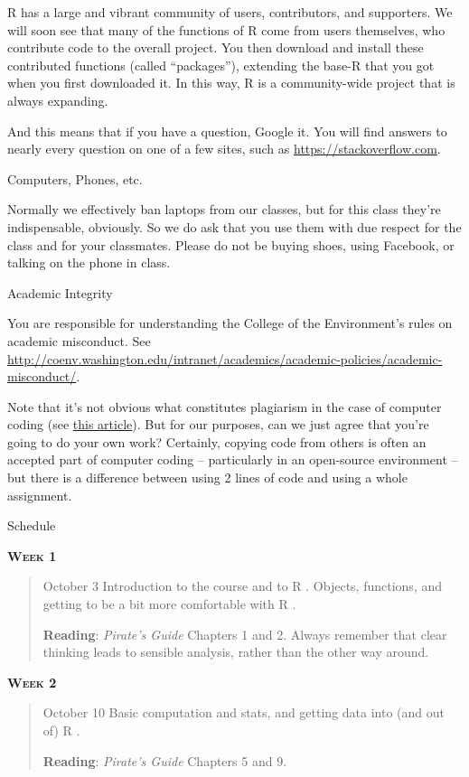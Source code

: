 \documentclass[11pt,letterpaper]{article}
\newcommand{\R}[0]{\textsf{R }}
\begin{document}
\R has a large and vibrant community of users, contributors, and supporters. We will soon see that many of the functions of \R come from users themselves, who contribute code to the overall project. You then download and install these contributed functions (called ``packages''), extending the base-\R that you got when you first downloaded it. In this way, \R is a community-wide project that is always expanding. 

And this means that if you have a question, Google it.  You will find answers to nearly every question on one of a few sites, such as \url{https://stackoverflow.com}.

{\Large Computers, Phones, etc.}\hrulefill

Normally we effectively ban laptops from our classes, but for this class they're indispensable, obviously. So we do ask that you use them with due respect for the class and for your classmates. Please do not be buying shoes, using Facebook, or talking on the phone in class.

{\Large Academic Integrity}\hrulefill

You are responsible for understanding the College of the Environment's
rules on academic misconduct. See
\url{http://coenv.washington.edu/intranet/academics/academic-policies/academic-misconduct/}.

Note that it's not obvious what constitutes plagiarism in the case of computer coding (see \href{https://www.nytimes.com/2017/05/29/us/computer-science-cheating.html}{\underline{this article}}). But for our purposes, can we just agree that you're going to do your own work? Certainly, copying code from others is often an accepted part of computer coding -- particularly in an open-source environment -- but there is a difference between using 2 lines of code and using a whole assignment.
\pagebreak

\huge Schedule
\hrulefill

\normalsize


\textbf{\textsc{Week 1}}
		\begin{quote}	
		October 3  \textbullet \space Introduction to the course and to \R. Objects, functions, and getting to be a bit more comfortable with \R.
		
		\textbf{Reading}: \textit{Pirate's Guide} Chapters 1 and 2. 
		Always remember that clear thinking leads to sensible analysis, rather than the other way around.
		\end{quote}

\textbf{\textsc{Week 2}}
		\begin{quote}	
		October 10  \textbullet \space Basic computation and stats, and getting data into (and out of) \R. 
		
		\textbf{Reading}: \textit{Pirate's Guide} Chapters 5 and 9.	
		\end{quote}
\end{document}
